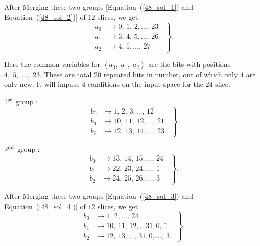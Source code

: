 After Merging these two groups [Equation~(\ref{48_sol_1}) and 
Equation~(\ref{48_sol_2})] of $12$ slices, we get
\begin{equation}
    \left.
    \begin{aligned}       
    a_0 &\rightarrow 0,\, 1,\, 2,\ldots ,\, 23\\
    a_1 & \rightarrow 3,\, 4,\, 5,\ldots ,\, 26\\
    a_2 & \rightarrow 4,\, 5,\ldots,\, 27
    \end{aligned}
    \;\;\right\}.
\end{equation}

Here the common variables for $\left< a_0,\; a_1,\;a_2\right>$ are the bits with positions
$4, \;5,\;\ldots,\;23$. These are total $20$ repeated bits in number, out of which only $4$ are only new. It will impose $4$ conditions on the input space for the $24$-slice.

$1^{\rm st}$ group :
\begin{equation}\label{48_sol_3}
    \left.
    \begin{aligned}
        b_0 &\rightarrow 1,\, 2,\, 3, \ldots ,\, 12\\
        b_1 &\rightarrow 10,\,11, \,12, \ldots ,\, 21\\
        b_2 &\rightarrow 12,\,13,\,14, \ldots ,\, 23
    \end{aligned}
    \;\;\right\}
\end{equation}

$2^{\rm nd}$ group :
\begin{equation}\label{48_sol_4}
    \left.
    \begin{aligned}    
      b_0 & \rightarrow 13,\, 14,\, 15, \ldots , \,24\\
      b_1 & \rightarrow 22,\, 23, \,24, \ldots , \,1\\
      b_2 & \rightarrow 24,\, 25,\,26, \ldots , \,3
    \end{aligned}
    \;\;\right\}.
\end{equation}

After Merging these two groups [Equation~(\ref{48_sol_3}) and 
Equation~(\ref{48_sol_4})] of $12$ slices, we get
\begin{equation}
    \left.
    \begin{aligned}       
    b_0 &\rightarrow 1,\, 2,\ldots ,\, 24\\
    b_1 & \rightarrow 10,\, 11,\, 12,\ldots 31, 0,\, 1\\
    b_2 & \rightarrow 12,\, 13,\ldots,\, 31, 0,  \ldots,\, 3
    \end{aligned}
    \;\;\right\}.
\end{equation}


